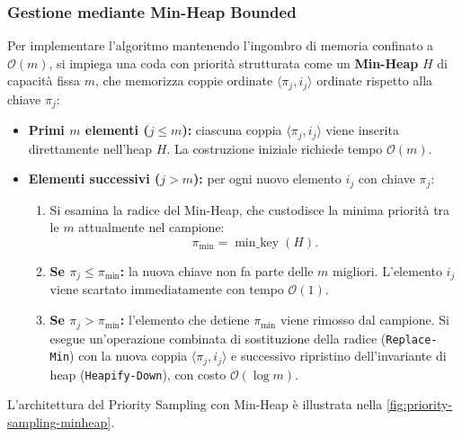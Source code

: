 \subsubsection{Gestione mediante Min-Heap Bounded}
Per implementare l'algoritmo mantenendo l'ingombro di memoria confinato a $\mathcal{O}(m)$, si impiega una coda con priorità strutturata come un \textbf{Min-Heap} $H$ di capacità fissa $m$, che memorizza coppie ordinate $\langle \pi_j, i_j \rangle$ ordinate rispetto alla chiave $\pi_j$:
\begin{itemize}
  \item \textbf{Primi $m$ elementi ($j \le m$):} ciascuna coppia $\langle \pi_j, i_j \rangle$ viene inserita direttamente nell'heap $H$. La costruzione iniziale richiede tempo $\mathcal{O}(m)$.
  \item \textbf{Elementi successivi ($j > m$):} per ogni nuovo elemento $i_j$ con chiave $\pi_j$:
  \begin{enumerate}
    \item Si esamina la radice del Min-Heap, che custodisce la minima priorità tra le $m$ attualmente nel campione:
    \begin{equation}
      \pi_{\min} = \operatorname{min\_key}(H).
    \end{equation}
    \item \textbf{Se $\pi_j \le \pi_{\min}$:} la nuova chiave non fa parte delle $m$ migliori. L'elemento $i_j$ viene scartato immediatamente con tempo $\mathcal{O}(1)$.
    \item \textbf{Se $\pi_j > \pi_{\min}$:} l'elemento che detiene $\pi_{\min}$ viene rimosso dal campione. Si esegue un'operazione combinata di sostituzione della radice (\texttt{Replace-Min}) con la nuova coppia $\langle \pi_j, i_j \rangle$ e successivo ripristino dell'invariante di heap (\texttt{Heapify-Down}), con costo $\mathcal{O}(\log m)$.
  \end{enumerate}
\end{itemize}

L'architettura del Priority Sampling con Min-Heap è illustrata nella \autoref{fig:priority-sampling-minheap}.

